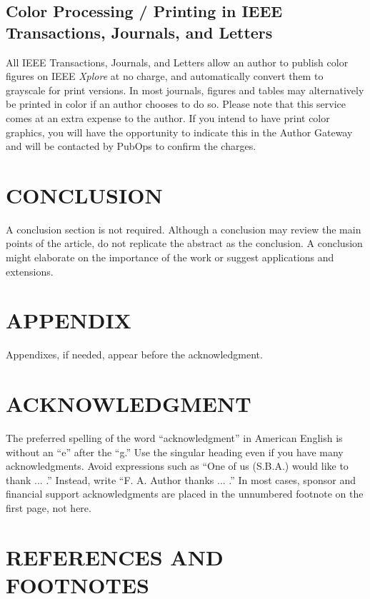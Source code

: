 \documentclass[letter]{IEEEtaes}
\begin{document}
\subsection{Color Processing / Printing in IEEE Transactions, Journals, and Letters}

All IEEE Transactions, Journals, and Letters allow an author to publish color figures on IEEE \emph{Xplore} at no charge, and automatically convert them to grayscale for print versions. In most journals, figures and tables may alternatively be printed in color if an author chooses to do so. Please note that this service comes at an extra expense to the author. If you intend to have print color graphics, you will have the opportunity to indicate this in the Author Gateway and will be contacted by PubOps to confirm the charges.

\section{CONCLUSION}

A conclusion section is not required. Although a conclusion may review the main points of the article, do not replicate the abstract as the conclusion. A conclusion might elaborate on the importance of the work or suggest applications and extensions.

\section*{APPENDIX}

Appendixes, if needed, appear before the acknowledgment.

\section*{ACKNOWLEDGMENT}

The preferred spelling of the word ``acknowledgment'' in American English is without an ``e'' after the ``g.'' Use the singular heading even if you have many acknowledgments. Avoid expressions such as ``One of us (S.B.A.) would like to thank ... .'' Instead, write ``F. A. Author thanks ... .'' In most cases, sponsor and financial support acknowledgments are placed in the unnumbered footnote on the first page, not here.

\section*{REFERENCES AND FOOTNOTES}
\end{document}
